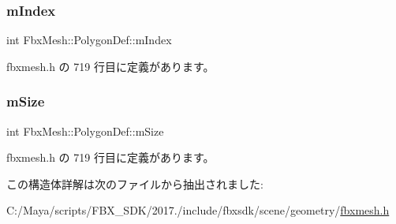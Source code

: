 \subsubsection{\texorpdfstring{m\+Index}{mIndex}}
{\footnotesize\ttfamily int Fbx\+Mesh\+::\+Polygon\+Def\+::m\+Index}



 fbxmesh.\+h の 719 行目に定義があります。

\mbox{\label{struct_fbx_mesh_1_1_polygon_def_a77222b3c2e42261e765b21a871c4c066}} 
\subsubsection{\texorpdfstring{m\+Size}{mSize}}
{\footnotesize\ttfamily int Fbx\+Mesh\+::\+Polygon\+Def\+::m\+Size}



 fbxmesh.\+h の 719 行目に定義があります。



この構造体詳解は次のファイルから抽出されました\+:\begin{DoxyCompactItemize}
\item 
C\+:/\+Maya/scripts/\+F\+B\+X\+\_\+\+S\+D\+K/2017./include/fbxsdk/scene/geometry/\hyperlink{fbxmesh_8h}{fbxmesh.\+h}\end{DoxyCompactItemize}
